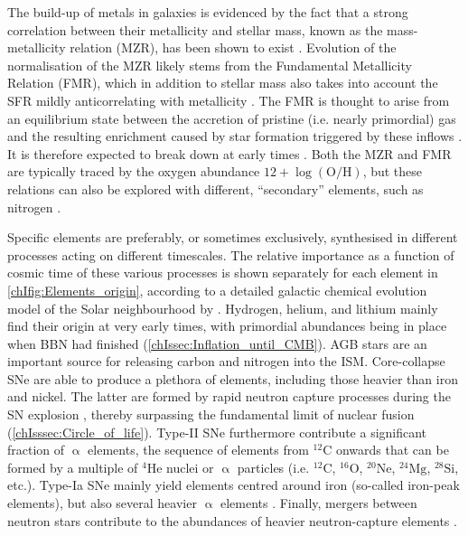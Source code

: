 The build-up of metals in galaxies is evidenced by the fact that a strong correlation between their metallicity and stellar mass, known as the mass-metallicity relation (MZR), has been shown to exist \citep[at least at late times, $z \lesssim 3$;][]{2008A&A...488..463M}. Evolution of the normalisation of the MZR likely stems from the Fundamental Metallicity Relation (FMR), which in addition to stellar mass also takes into account the SFR mildly anticorrelating with metallicity \citep{2010MNRAS.408.2115M}. The FMR is thought to arise from an equilibrium state between the accretion of pristine (i.e. nearly primordial) gas and the resulting enrichment caused by star formation triggered by these inflows \citep{2020MNRAS.491..944C}. It is therefore expected to break down at early times \citep[e.g.][]{2022arXiv220712375C}. Both the MZR and FMR are typically traced by the oxygen abundance $12 + \log \left( \mathrm{O/H} \right)$, but these relations can also be explored with different, ``secondary'' elements, such as nitrogen \citep[whose production rate is dependent on the metallicity itself; e.g.][]{2022MNRAS.512.2867H}.

Specific elements are preferably, or sometimes exclusively, synthesised in different processes acting on different timescales. The relative importance as a function of cosmic time of these various processes is shown separately for each element in \cref{chIfig:Elements_origin}, according to a detailed galactic chemical evolution model of the Solar neighbourhood by \citet{2020ApJ...900..179K}. Hydrogen, helium, and lithium mainly find their origin at very early times, with primordial abundances being in place when BBN had finished (\cref{chIssec:Inflation_until_CMB}). AGB stars are an important source for releasing carbon and nitrogen into the ISM. Core-collapse SNe are able to produce a plethora of elements, including those heavier than iron and nickel. The latter are formed by rapid neutron capture processes during the SN explosion \citep{2010gfe..book.....M}, thereby surpassing the fundamental limit of nuclear fusion (\cref{chIsssec:Circle_of_life}). Type-II SNe furthermore contribute a significant fraction of $\upalpha$ elements, the sequence of elements from $^{12}\text{C}$ onwards that can be formed by a multiple of $^{4}\text{He}$ nuclei or $\upalpha$ particles (i.e. $^{12}\text{C}$, $^{16}\text{O}$, $^{20}\text{Ne}$, $^{24}\text{Mg}$, $^{28}\text{Si}$, etc.). Type-Ia SNe mainly yield elements centred around iron (so-called iron-peak elements), but also several heavier $\upalpha$ elements . Finally, mergers between neutron stars contribute to the abundances of heavier neutron-capture elements \citep{2017Natur.551...75S}.

